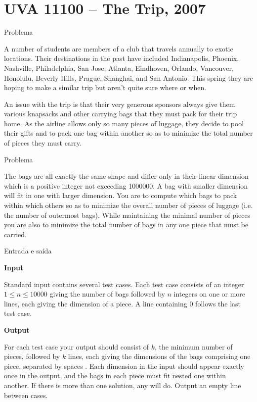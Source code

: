 \section{UVA 11100 -- The Trip, 2007}

\begin{frame}[fragile]{Problema}

A number of students are members of a club that travels annually to exotic locations. Their 
destinations in the past have included Indianapolis, Phoenix, Nashville, Philadelphia, San Jose, 
Atlanta, Eindhoven, Orlando, Vancouver, Honolulu, Beverly Hills, Prague, Shanghai, and 
San Antonio. This spring they are hoping to make a similar trip but aren’t quite sure where or when.

An issue with the trip is that their very generous sponsors always give them various knapsacks and 
other carrying bags that they must pack for their trip home.  As the airline allows only so many 
pieces of luggage, they decide to pool their gifts and to pack one bag within another so as to 
minimize the total number of pieces they must carry.

\end{frame}

\begin{frame}[fragile]{Problema}

The bags are all exactly the same shape and differ only in their linear dimension which is a 
positive integer not exceeding 1000000. A bag with smaller dimension will fit in one with larger 
dimension. You are to compute which bags to pack within which others so as to minimize the overall 
number of pieces of luggage (i.e. the number of outermost bags). While maintaining the minimal 
number of pieces you are also to minimize the total number of bags in any one piece that must be 
carried.

\end{frame}

\begin{frame}[fragile]{Entrada e saída}

\textbf{Input}

Standard input contains several test cases. Each test case consists of an integer 
$1\leq n\leq 10000$ giving the number of bags followed by $n$ integers on one or more lines, 
each giving the dimension of a piece.  A line containing $0$ follows the last test case.

\vspace{0.1in}

\textbf{Output}

For each test case your output should consist of $k$, the minimum number of pieces, followed by 
$k$ lines, each giving the dimensions of the bags comprising one piece, separated by spaces
. Each dimension in the input should appear exactly once in the output, and the bags in each piece 
must fit nested one
within another. If there is more than one solution, any will do. Output an empty line between cases.

\end{frame}


